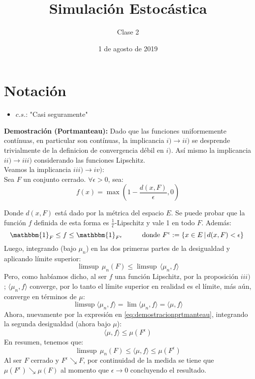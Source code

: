 \documentclass[a4paper]{article}
\title{Simulación Estocástica}
\author{Clase 2}
\date{1 de agosto de 2019}
\numberwithin{equation}{subsection}
\begin{document}
\maketitle

\section{Notación}
\begin{itemize}
    \item $c.s.$: "Casi seguramente"
\end{itemize}

\textbf{Demostración (Portmanteau):} Dado que las funciones uniformemente contínuas, en particular son contínuas, la implicancia $i)\rightarrow ii)$ se desprende trivialmente de la definicion de convergencia débil en $i)$. Así mismo la implicancia $ii) \rightarrow iii)$ considerando las funciones Lipschitz.\\
Veamos la implicancia $iii) \rightarrow iv)$: \\ \newline
Sea $F$ un conjunto cerrado. $\forall \epsilon > 0$, sea:
\begin{equation}
   f(x) = \max\left(1-\frac{d(x,F)}{\epsilon}, 0\right)
   \label{eq:dem1}
\end{equation}

Donde $d(x,F)$ está dado por la métrica del espacio $E$. Se puede probar que la función $f$ definida de esta forma es $\frac{1}{\epsilon}$-Lipschitz y vale 1 en todo $F$. Además:
\begin{equation}
    \mathbbm{1}_F \leq f \leq \mathbbm{1}_{F^{\epsilon}}\hspace{1cm}\text{donde }F^{\epsilon}:=\{x\in E\,|\,d(x,F)<\epsilon\}\
    \label{eq:demostracionprtmanteau}
\end{equation}
Luego, integrando (bajo $\mu_n$) en las dos primeras partes de la desigualdad y aplicando límite superior:
\[\limsup\,\mu_n(F)\leq \limsup\,\langle \mu_n,f\rangle\]
Pero, como habíamos dicho, al ser $f$ una función Lipschitz, por la proposición $iii)$; $\langle \mu_n,f\rangle$ converge, por lo tanto el límite superior en realidad es el límite, más aún, converge en términos de $\mu$:
\begin{equation}
    \limsup \langle \mu_n,f\rangle = \lim \langle\mu_n,f\rangle = \langle \mu,f\rangle
\end{equation}
Ahora, nuevamente por la expresión en \ref{eq:demostracionprtmanteau}, integrando la segunda desigualdad (ahora bajo $\mu$):
\[\langle\mu,f\rangle \leq \mu(F^{\epsilon})\]
En resumen, tenemos que:
\[\limsup\,\mu_n(F) \leq \langle\mu,f\rangle \leq\mu(F^{\epsilon})\]
Al ser $F$ cerrado y $F^{\epsilon} \searrow F$, por continuidad de la medida se tiene que $\mu(F^{\epsilon})\searrow \mu(F)$ al momento que $\epsilon \rightarrow 0$ concluyendo el resultado.
\end{document}
